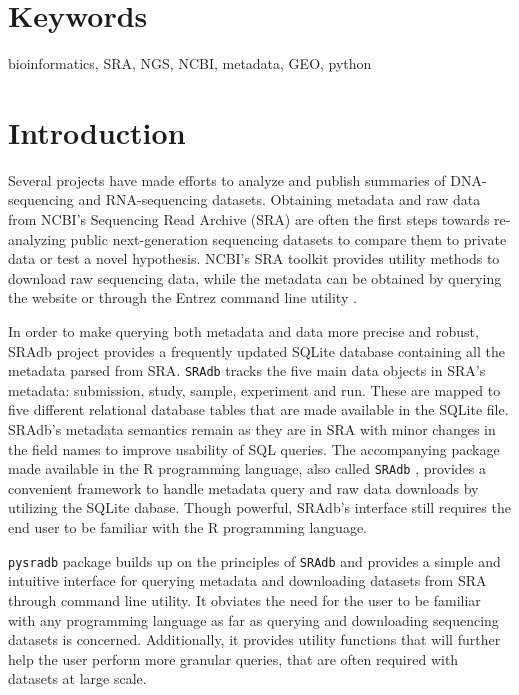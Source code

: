 \documentclass[9pt,a4paper]{extarticle}
\begin{document}
\section*{Keywords}
bioinformatics, SRA, NGS, NCBI, metadata, GEO, python



\clearpage
\pagestyle{main}
\section*{Introduction}
Several projects have made efforts to analyze and publish summaries of DNA-
sequencing \cite{macarthur2012systematic} and RNA-sequencing
\cite{lachmann2018massive, collado2017reproducible} datasets. Obtaining metadata
and raw data from NCBI's Sequencing Read Archive (SRA) \cite{leinonen2010sequence}
are often the first steps towards re-analyzing public next-generation sequencing datasets to compare them to private data or test a novel hypothesis. NCBI's SRA toolkit \cite{ncbisratoolit}
provides utility methods to download raw sequencing data, while the metadata can
be obtained by querying the website or through the Entrez command line utility 
\cite{kans2018entrez}.


In order to make querying both metadata and data more precise and robust, SRAdb
\cite{zhu2013sradb} project provides a frequently updated SQLite database containing all the metadata parsed from SRA. \texttt{SRAdb} tracks the five main data objects in SRA's metadata: submission, study, sample, experiment and run. These are mapped to five different relational database tables that are made available in the SQLite file.
SRAdb's metadata semantics remain as they are in SRA with minor changes in the field names to improve usability of SQL queries. The accompanying package made available in the R programming language, also called \texttt{SRAdb} \cite{zhudavissradb},
provides a convenient framework to handle metadata query and raw data downloads by 
utilizing the SQLite dabase. Though powerful, SRAdb's interface still requires the end user to be familiar with the R programming language. 


\texttt{pysradb} package builds up on the principles of \texttt{SRAdb} and 
provides a simple and intuitive interface for querying metadata and downloading
datasets from SRA through command line utility. It obviates the need for the
user to be familiar with any programming language as far as querying and downloading sequencing datasets is concerned. Additionally, it provides utility functions that will further help the user perform more granular queries, that
are often required with datasets at large scale.
\end{document}
